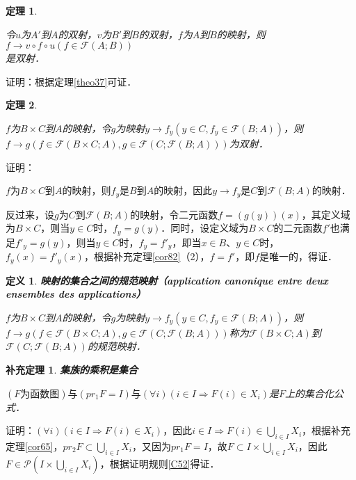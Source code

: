 \documentclass[12pt, a4paper, oneside]{book}
\newtheorem{theo}{定理}
\newtheorem{cor}{补充定理}
\newtheorem{de}{定义}
\begin{document}
			\begin{theo}\label{theo38}
				\hfill\par
				令$u$为$A'$到$A$的双射，$v$为$B'$到$B$的双射，$f$为$A$到$B$的映射，则$f\to v\circ f\circ u(f\in \mathcal{F}(A; B))$\\是双射．
			\end{theo}
			证明：根据定理\ref{theo37}可证．
						
			\begin{theo}\label{theo39}
				\hfill\par
				$f$为$B\times C$到$A$的映射，令$g$为映射$y\to f_y(y\in C, f_y\in \mathcal{F}(B; A))$，则$f\to g(f\in \mathcal{F}(B\times C; A), g\in \mathcal{F}(C; \mathcal{F}(B; A)))$为双射．
			\end{theo}
			证明：
			\par
			$f$为$B\times C$到$A$的映射，则$f_y$是$B$到$A$的映射，因此$y\to f_y$是$C$到$\mathcal{F}(B; A)$的映射．
			\par
			反过来，设$g$为$C$到$\mathcal{F}(B; A)$的映射，令二元函数$f=(g(y))(x)$，其定义域为$B\times C$，则当$y\in C$时，$f_y=g(y)$．同时，设定义域为$B\times C$的二元函数$f'$也满足${f'}_y=g(y)$，则当$y\in C$时，$f_y={f'}_y$，即当$x\in B$、$y\in C$时，$f_y(x)={f'}_y(x)$，根据补充定理\ref{cor82}（2），$f=f'$，即$f$是唯一的，得证．

			\begin{de}
				\textbf{映射的集合之间的规范映射（application canonique entre deux ensembles des applications）}
				\par
				$f$为$B\times C$到$A$的映射，令$g$为映射$y\to f_y(y\in C, f_y\in \mathcal{F}(B; A))$，则$f\to g(f\in \mathcal{F}(B\times C; A), g\in \mathcal{F}(C; \mathcal{F}(B; A)))$称为$\mathcal{F}(B\times C; A)$到$\mathcal{F}(C; \mathcal{F}(B; A))$的规范映射．			
			\end{de}
			
			\begin{cor}\label{cor124}
				\textbf{集族的乘积是集合}\par
				$(F\text{为函数图})\text{与}(pr_1F= I)\text{与}(\forall i)(i\in I\Rightarrow F(i)\in X_i)$是$F$上的集合化公式．
			\end{cor}
			证明：$(\forall i)(i\in I\Rightarrow F(i)\in X_i)$，因此$i\in I\Rightarrow F(i)\in \bigcup\limits_{i\in I}X_i$，根据补充定理\ref{cor65}，$pr_2F\subset \bigcup\limits_{i\in I}X_i$，又因为$pr_1F=I$，故$F\subset I\times \bigcup\limits_{i\in I}X_i$，因此$F\in \mathcal{P}(I\times \bigcup\limits_{i\in I}X_i)$，根据证明规则\ref{C52}得证．
\end{document}
